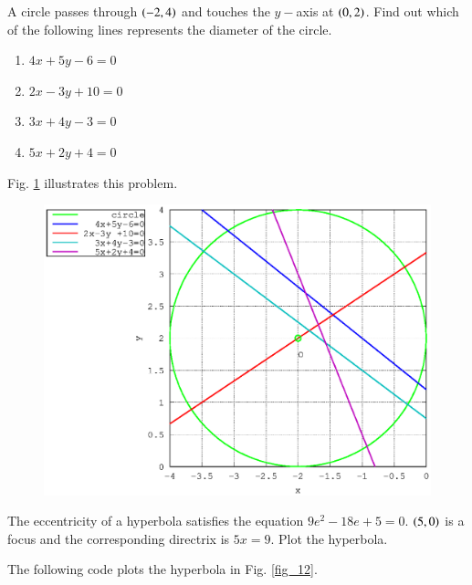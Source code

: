 \documentclass[journal,12pt,twocolumn]{IEEEtran}
\begin{document}
\begin{problem}
A circle passes through $\left(-2,4\right)$ and touches the $y-$axis at $\left(0,2\right)$. Find out which of the following lines represents the diameter of the circle.
\begin{enumerate}
\item $4x+5y-6=0$
\item $2x-3y +10 = 0$
\item $3x+4y-3 = 0$
\item $5x+2y+4 = 0$
\end{enumerate}
\end{problem}
%
\solution

Fig. \ref{fig_11} illustrates this problem.

\begin{figure}
\begin{center}
\includegraphics[width=\columnwidth]{./version_2/ee16b1011/ee16b1011}
\end{center}
\label{fig_11}	
\end{figure}
%
\begin{problem}
The eccentricity of a hyperbola satisfies the equation $9e^2-18e+5 = 0$. $\left(5,0\right)$ is a focus and the corresponding directrix is $5x = 9$. Plot the hyperbola.
\end{problem}
%
\solution

%
The following code plots the hyperbola in Fig. \ref{fig_12}.

\end{document}
